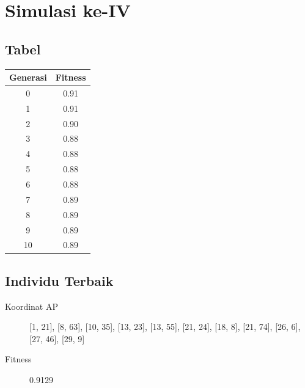 \documentclass[11pt,a4paper,titlepage]{report}
\begin{document}
	\section*{Simulasi ke-IV}
	\subsection*{Tabel}
	\begin{tabular}{|c|c|}
		\hline Generasi & Fitness \\ 
		\hline 0 & 0.91 \\ 
		\hline 1 & 0.91 \\ 
		\hline 2 & 0.90 \\ 
		\hline 3 & 0.88 \\ 
		\hline 4 & 0.88 \\ 
		\hline 5 & 0.88 \\ 
		\hline 6 & 0.88 \\ 
		\hline 7 & 0.89 \\ 
		\hline 8 & 0.89 \\ 
		\hline 9 & 0.89 \\ 
		\hline 10 & 0.89 \\
		\hline
	\end{tabular} 
	\subsection*{Individu Terbaik}
	\begin{description}
		\item[Koordinat AP] [1, 21], [8, 63], [10, 35], [13, 23], [13, 55], [21, 24], [18, 8], [21, 74], [26, 6], [27, 46], [29, 9]
		\item[Fitness] 0.9129
	\end{description}
	\newpage
\end{document}
